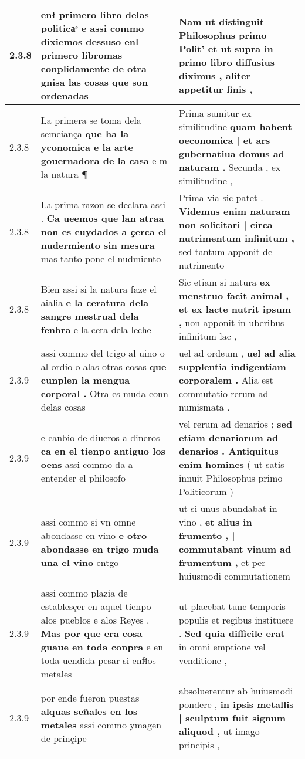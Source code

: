 \begin{tabular}{|p{1cm}|p{6.5cm}|p{6.5cm}|}
2.3.8 & enł primero libro delas politicaͤ \textbf{ e assi commo dixiemos dessuso enl primero } libromas conplidamente de otra gnisa las cosas que son ordenadas & Nam ut distinguit Philosophus primo Polit’ \textbf{ et ut supra in primo libro diffusius diximus , } aliter appetitur finis , \\\hline
2.3.8 & La primera se toma dela semeiança \textbf{ que ha la yconomica e la arte gouernadora de la casa } e m la natura ¶ & Prima sumitur ex similitudine \textbf{ quam habent oeconomica | et ars gubernatiua domus ad naturam . } Secunda , ex similitudine , \\\hline
2.3.8 & La prima razon se declara assi . \textbf{ Ca ueemos que lan atraa non es cuydados a çerca el nudermiento sin mesura } mas tanto pone el nudmiento & Prima via sic patet . \textbf{ Videmus enim naturam non solicitari | circa nutrimentum infinitum , } sed tantum apponit de nutrimento \\\hline
2.3.8 & Bien assi si la natura faze el aialia \textbf{ e la ceratura dela sangre mestrual dela fenbra } e la cera dela leche & Sic etiam si natura \textbf{ ex menstruo facit animal , et ex lacte nutrit ipsum , } non apponit in uberibus infinitum lac , \\\hline
2.3.9 & assi commo del trigo al uino o al ordio o alas otras cosas \textbf{ que cunplen la mengua corporal . } Otra es muda conn delas cosas & uel ad ordeum , \textbf{ uel ad alia supplentia indigentiam corporalem . } Alia est commutatio rerum ad numismata . \\\hline
2.3.9 & e canbio de diueros a dineros \textbf{ ca en el tienpo antiguo los oens } assi commo da a entender el philosofo & vel rerum ad denarios ; \textbf{ sed etiam denariorum ad denarios . Antiquitus enim homines } ( ut satis innuit Philosophus primo Politicorum ) \\\hline
2.3.9 & assi commo si vn omne abondasse en vino \textbf{ e otro abondasse en trigo muda una el vino } entgo & ut si unus abundabat in vino , \textbf{ et alius in frumento , | commutabant vinum ad frumentum , } et per huiusmodi commutationem \\\hline
2.3.9 & assi commo plazia de establesçer en aquel tienpo alos pueblos e alos Reyes . \textbf{ Mas por que era cosa guaue en toda conpra } e en toda uendida pesar si enfͤlos metales & ut placebat tunc temporis populis et regibus instituere . \textbf{ Sed quia difficile erat } in omni emptione vel venditione , \\\hline
2.3.9 & por ende fueron puestas \textbf{ alquas señales en los metales } assi commo ymagen de prinçipe & absoluerentur ab huiusmodi pondere , \textbf{ in ipsis metallis | sculptum fuit signum aliquod , } ut imago principis , \\\hline

\end{tabular}
